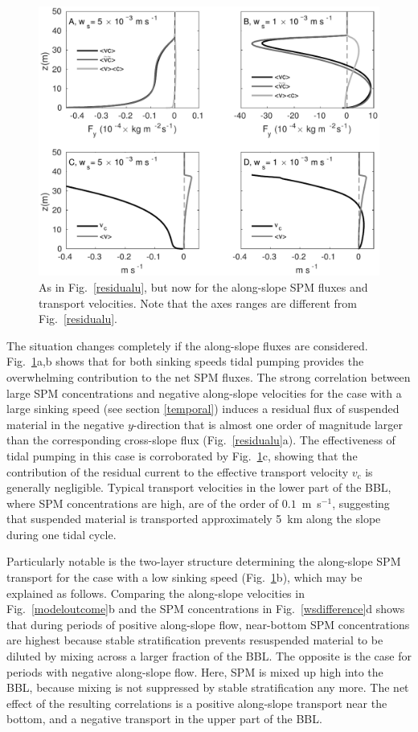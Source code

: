 \begin{figure}
  \noindent\includegraphics[width=40pc]{restransv.pdf}
  \caption{As in Fig.\ \ref{residualu}, but now for the along-slope
    SPM fluxes and transport velocities. Note that the axes ranges are
    different from Fig.\ \ref{residualu}.}
  \label{residualv}
\end{figure}

The situation changes completely if the along-slope fluxes are
considered. Fig.\ \ref{residualv}a,b shows that for both sinking
speeds tidal pumping provides the overwhelming contribution to the net
SPM fluxes. The strong correlation between large SPM concentrations
and negative along-slope velocities for the case with a large sinking
speed (see section \ref{temporal}) induces a residual flux of
suspended material in the negative $y$-direction that is almost one
order of magnitude larger than the corresponding cross-slope flux
(Fig.\ \ref{residualu}a). The effectiveness of tidal pumping in this
case is corroborated by Fig.\ \ref{residualv}c, showing that the
contribution of the residual current to the effective transport
velocity $v_c$ is generally negligible. Typical transport velocities
in the lower part of the BBL, where SPM concentrations are high, are
of the order of $0.1$~m~s$^{-1}$, suggesting that suspended material
is transported approximately 5~km along the slope during one tidal
cycle.

Particularly notable is the two-layer structure determining the
along-slope SPM transport for the case with a low sinking speed
(Fig.\ \ref{residualv}b), which may be explained as follows. Comparing
the along-slope velocities in Fig.\ \ref{modeloutcome}b and the SPM
concentrations in Fig.\ \ref{wsdifference}d shows that during periods
of positive along-slope flow, near-bottom SPM concentrations are
highest because stable stratification prevents resuspended material to
be diluted by mixing across a larger fraction of the BBL. The opposite
is the case for periods with negative along-slope flow. Here, SPM is
mixed up high into the BBL, because mixing is not suppressed by stable
stratification any more. The net effect of the resulting correlations
is a positive along-slope transport near the bottom, and a negative
transport in the upper part of the BBL.



